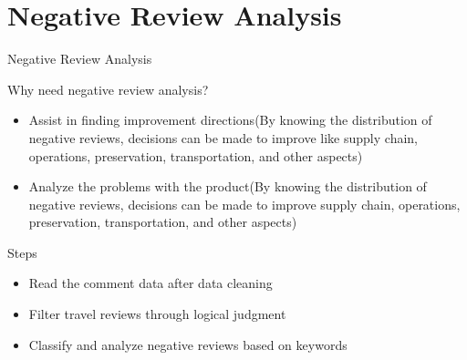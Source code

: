 \section{Negative Review Analysis}

\begin{frame}{Negative Review Analysis}
    
	\begin{block}{Why need negative review analysis?}
		\begin{itemize}
			\item Assist in finding improvement directions(By knowing the distribution of negative reviews, decisions can be made to improve like supply chain, operations, preservation, transportation, and other aspects)
			\item Analyze the problems with the product(By knowing the distribution of negative reviews, decisions can be made to improve supply chain, operations, preservation, transportation, and other aspects)
		\end{itemize}
	\end{block}
    
	\begin{block}{Steps}
		\begin{itemize}
			\item Read the comment data after data cleaning
			\item Filter travel reviews through logical judgment
			\item Classify and analyze negative reviews based on keywords
		\end{itemize}
	\end{block}

\end{frame}

